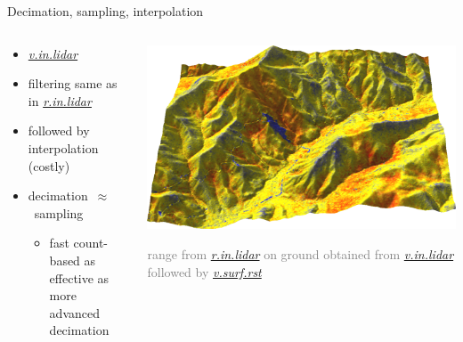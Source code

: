 \documentclass[xcolor={dvipsnames,usenames},beamer,aspectratio=169]{beamer}
\newcommand{\gmodule}[1]{\href{http://grass.osgeo.org/grass71/manuals/#1.html}{\emph{#1}}}
\begin{document}
\begin{frame}{Decimation, sampling, interpolation}

\begin{columns}
\begin{column}{0.3\textwidth}

\begin{itemize}
  \item \gmodule{v.in.lidar}
  \item filtering same as in \gmodule{r.in.lidar}
  \item followed by interpolation (costly)
  \item decimation~$\approx$~sampling
  \begin{itemize}
  \item fast count-based as effective as more advanced decimation
  \end{itemize}
\end{itemize}

\end{column}
\begin{column}{0.68\textwidth}


\begin{center}
  \includegraphics[width=\textwidth]{grass/range_on_ground_from_north}

  \footnotesize
  \textcolor{gray}{
  range from \gmodule{r.in.lidar} on ground obtained
  from \gmodule{v.in.lidar} followed by \gmodule{v.surf.rst}
  }
\end{center}

\end{column}
\end{columns}

\end{frame}
\end{document}

